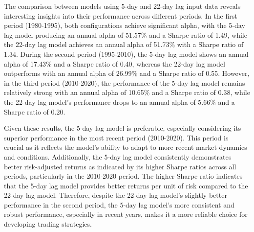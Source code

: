 \documentclass{article}
\begin{document}
The comparison between models using 5-day and 22-day lag input data reveals interesting insights into their performance across different periods. In the first period (1980-1995), both configurations achieve significant alpha, with the 5-day lag model producing an annual alpha of 51.57\% and a Sharpe ratio of 1.49, while the 22-day lag model achieves an annual alpha of 51.73\% with a Sharpe ratio of 1.34. During the second period (1995-2010), the 5-day lag model shows an annual alpha of 17.43\% and a Sharpe ratio of 0.40, whereas the 22-day lag model outperforms with an annual alpha of 26.99\% and a Sharpe ratio of 0.55. However, in the third period (2010-2020), the performance of the 5-day lag model remains relatively strong with an annual alpha of 10.65\% and a Sharpe ratio of 0.38, while the 22-day lag model's performance drops to an annual alpha of 5.66\% and a Sharpe ratio of 0.20.

Given these results, the 5-day lag model is preferable, especially considering its superior performance in the most recent period (2010-2020). This period is crucial as it reflects the model's ability to adapt to more recent market dynamics and conditions. Additionally, the 5-day lag model consistently demonstrates better risk-adjusted returns as indicated by its higher Sharpe ratios across all periods, particularly in the 2010-2020 period. The higher Sharpe ratio indicates that the 5-day lag model provides better returns per unit of risk compared to the 22-day lag model. Therefore, despite the 22-day lag model's slightly better performance in the second period, the 5-day lag model's more consistent and robust performance, especially in recent years, makes it a more reliable choice for developing trading strategies.

\end{document}
